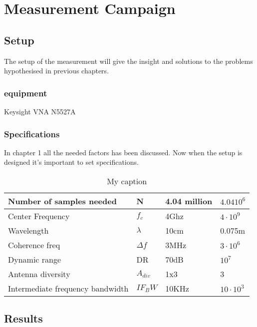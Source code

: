 \chapter{Measurement Campaign}
\section{Setup}
The setup of the measurement will give the insight and solutions to the problems hypothesised in previous chapters. 
\subsection{equipment}
Keysight \gls{VNA} N5527A
\subsection{Specifications}
In chapter 1 all the needed factors has been discussed. Now when the setup is designed it's important to set specifications.
\begin{table}[]
\centering
\caption{My caption}
\label{final_specs}
\begin{tabular}{|l|l|l|l|}
\hline
Number of samples needed         & N           & 4.04 million   & $4.04 10^6$        \\ \hline
Center Frequency                 & $f_c$       & 4Ghz           & $4 \cdot 10^9$     \\ \hline
Wavelength                       & $\lambda$   & 10cm           & 0.075m               \\ \hline
Coherence freq                   & $\Delta f$  & 3MHz           & $3 \cdot 10^6$     \\ \hline
Dynamic range                    & DR          & 70dB           & $10^7$             \\ \hline
Antenna diversity                & $A_{div}$   & 1x3            & 3                  \\ \hline
Intermediate frequency bandwidth & $IF_BW$     & 10KHz          & $10 \cdot 10^3$ \\ \hline
\end{tabular}
\end{table}
\section{Results}